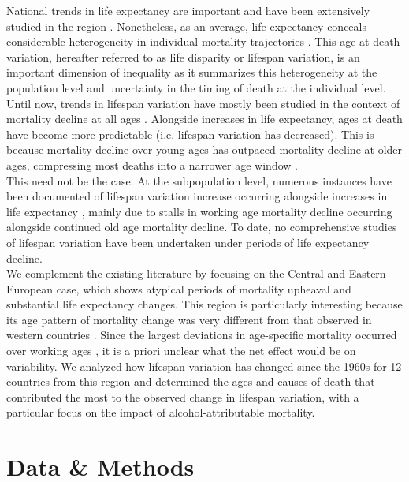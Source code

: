 \documentclass{article}
\begin{document}
\begin{spacing}{1.5}
National trends in life expectancy are important and have been extensively studied in the region \citep{mesle2004mortality, mesle2000, rychtarikova2004,shkolnikov2001,shkolnikov2006changing,leon2011}. Nonetheless, as an average, life expectancy conceals considerable heterogeneity in individual mortality trajectories \citep{edwards2005, wilmoth1999}. This age-at-death variation, hereafter referred to as life disparity or lifespan variation, is an important dimension of inequality as it summarizes this heterogeneity at the population level and uncertainty in the timing of death at the individual level. Until now, trends in lifespan variation have mostly been studied in the context of mortality decline at all ages \citep{edwards2005,smits2009,vaupel2011}. Alongside increases in life expectancy, ages at death have become more predictable (i.e. lifespan variation has decreased). This is because mortality decline over young ages has outpaced mortality decline at older ages, compressing most deaths into a narrower age window \citep{vaupel2011}.\\

This need not be the case. At the subpopulation level, numerous instances have been documented of lifespan variation increase occurring alongside increases in life expectancy \citep{vanraalte2014,sasson2016trends,seaman2016increasing, bronnum-hansen2017}, mainly due to stalls in working age mortality decline occurring alongside continued old age mortality decline. To date, no comprehensive studies of lifespan variation have been undertaken under periods of life expectancy decline.\\

We complement the existing literature by focusing on the Central and Eastern European case, which shows atypical periods of mortality upheaval and substantial life expectancy changes. This region is particularly interesting because its age pattern of mortality change was very different from that observed in western countries \citep{mesle2004mortality}. Since the largest deviations in age-specific mortality occurred over working ages \citep{rehm2007}, it is a priori unclear what the net effect would be on variability. We analyzed how lifespan variation has changed since the 1960s for 12 countries from this region and determined the ages and causes of death that contributed the most to the observed change in lifespan variation, with a particular focus on the impact of alcohol-attributable mortality. 


\section*{Data \& Methods}


\end{spacing}
\end{document}
